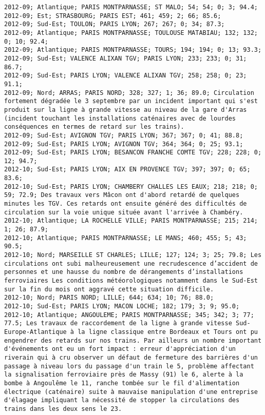 \documentclass{article}
\begin{document}
\begin{Verbatim}[commandchars=\\\{\}]
2012-09; Atlantique; PARIS MONTPARNASSE; ST MALO; 54; 54; 0; 3; 94.4; 
2012-09; Est; STRASBOURG; PARIS EST; 461; 459; 2; 66; 85.6; 
2012-09; Sud-Est; TOULON; PARIS LYON; 267; 267; 0; 34; 87.3; 
2012-09; Atlantique; PARIS MONTPARNASSE; TOULOUSE MATABIAU; 132; 132; 0; 10; 92.4; 
2012-09; Atlantique; PARIS MONTPARNASSE; TOURS; 194; 194; 0; 13; 93.3; 
2012-09; Sud-Est; VALENCE ALIXAN TGV; PARIS LYON; 233; 233; 0; 31; 86.7; 
2012-09; Sud-Est; PARIS LYON; VALENCE ALIXAN TGV; 258; 258; 0; 23; 91.1; 
2012-09; Nord; ARRAS; PARIS NORD; 328; 327; 1; 36; 89.0; Circulation fortement dégradée le 3 septembre par un incident important qui s'est produit sur la ligne à grande vitesse au niveau de la gare d'Arras (incident touchant les installations caténaires avec de lourdes conséquences en termes de retard sur les trains).
2012-09; Sud-Est; AVIGNON TGV; PARIS LYON; 367; 367; 0; 41; 88.8; 
2012-09; Sud-Est; PARIS LYON; AVIGNON TGV; 364; 364; 0; 25; 93.1; 
2012-09; Sud-Est; PARIS LYON; BESANCON FRANCHE COMTE TGV; 228; 228; 0; 12; 94.7; 
2012-10; Sud-Est; PARIS LYON; AIX EN PROVENCE TGV; 397; 397; 0; 65; 83.6; 
2012-10; Sud-Est; PARIS LYON; CHAMBERY CHALLES LES EAUX; 218; 218; 0; 59; 72.9; Des travaux vers Mâcon ont d'abord retardé de quelques minutes les TGV. Ces retards ont ensuite généré des difficultés de circulation sur la voie unique située avant l'arrivée à Chambéry.
2012-10; Atlantique; LA ROCHELLE VILLE; PARIS MONTPARNASSE; 215; 214; 1; 26; 87.9; 
2012-10; Atlantique; PARIS MONTPARNASSE; LE MANS; 460; 455; 5; 43; 90.5; 
2012-10; Nord; MARSEILLE ST CHARLES; LILLE; 127; 124; 3; 25; 79.8; Les circulations ont subi malheureusement une recrudescence d’accident de personnes et une hausse du nombre de dérangements d’installations ferroviaires Les conditions météorologiques notamment dans le Sud-Est sur la fin du mois ont aggravé cette situation difficile.
2012-10; Nord; PARIS NORD; LILLE; 644; 634; 10; 76; 88.0; 
2012-10; Sud-Est; PARIS LYON; MACON LOCHE; 182; 179; 3; 9; 95.0; 
2012-10; Atlantique; ANGOULEME; PARIS MONTPARNASSE; 345; 342; 3; 77; 77.5; Les travaux de raccordement de la ligne à grande vitesse Sud-Europe-Atlantique à la ligne classique entre Bordeaux et Tours ont pu engendrer des retards sur nos trains. Par ailleurs un nombre important d'événements ont eu un fort impact : erreur d'appréciation d'un riverain qui à cru observer un défaut de fermeture des barrières d'un passage à niveau lors du passage d'un train le 5, problème affectant la signalisation ferroviaire près de Massy (91) le 6, alerte à la bombe à Angoulême le 11, ranche tombée sur le fil d'alimentation électrique (caténaire) suite à mauvaise manipulation d'une entreprise d'élagage impliquant la nécessité de stopper la circulations des trains dans les deux sens le 23.

\end{Verbatim}
\end{document}
